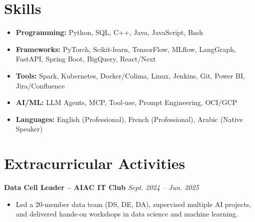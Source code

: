 \documentclass[11pt,a4paper]{article}
\newcommand{\resumeProject}[2]{
  \vspace{3pt}
  \noindent\textbf{#1} \hfill \textit{#2}
  \vspace{2pt}
}
\begin{document}
\section{Skills}
\begin{itemize}[label={}]
  \item \textbf{Programming:} Python, SQL, C++, Java, JavaScript, Bash
  \item \textbf{Frameworks:} PyTorch, Scikit-learn, TensorFlow, MLflow, LangGraph, FastAPI, Spring Boot, BigQuery, React/Next
  \item \textbf{Tools:} Spark, Kubernetes, Docker/Colima, Linux, Jenkins, Git, Power BI, Jira/Confluence
  \item \textbf{AI/ML:} LLM Agents, MCP, Tool-use, Prompt Engineering, OCI/GCP
  \item \textbf{Languages:} English (Professional), French (Professional), Arabic (Native Speaker)
\end{itemize}

\section{Extracurricular Activities}
\resumeProject{Data Cell Leader -- AIAC IT Club}{Sept. 2024 -- Jun. 2025}
\begin{itemize}
  \item Led a 20-member data team (DS, DE, DA), supervised multiple AI projects, and delivered hands-on workshops in data science and machine learning.
\end{itemize}
\end{document}
